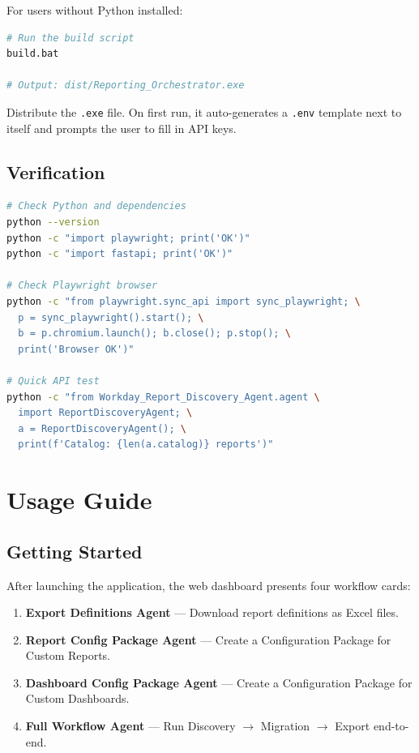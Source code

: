 \documentclass[12pt,a4paper]{article}
\begin{document}
For users without Python installed:

\begin{lstlisting}[language=bash, caption={Build Standalone .exe}, label={lst:build-exe}]
# Run the build script
build.bat

# Output: dist/Reporting_Orchestrator.exe
\end{lstlisting}

Distribute the \texttt{.exe} file. On first run, it auto-generates a \texttt{.env} template next to itself and prompts the user to fill in API keys.

\subsection{Verification}
\label{subsec:verification}

\begin{lstlisting}[language=bash, caption={Verify Installation}, label={lst:verify}]
# Check Python and dependencies
python --version
python -c "import playwright; print('OK')"
python -c "import fastapi; print('OK')"

# Check Playwright browser
python -c "from playwright.sync_api import sync_playwright; \
  p = sync_playwright().start(); \
  b = p.chromium.launch(); b.close(); p.stop(); \
  print('Browser OK')"

# Quick API test
python -c "from Workday_Report_Discovery_Agent.agent \
  import ReportDiscoveryAgent; \
  a = ReportDiscoveryAgent(); \
  print(f'Catalog: {len(a.catalog)} reports')"
\end{lstlisting}

\section{Usage Guide}
\label{sec:usage}

\subsection{Getting Started}
\label{subsec:getting-started}

After launching the application, the web dashboard presents four workflow cards:

\begin{enumerate}[leftmargin=2em]
  \item \textbf{Export Definitions Agent} --- Download report definitions as Excel files.
  \item \textbf{Report Config Package Agent} --- Create a Configuration Package for Custom Reports.
  \item \textbf{Dashboard Config Package Agent} --- Create a Configuration Package for Custom Dashboards.
  \item \textbf{Full Workflow Agent} --- Run Discovery $\rightarrow$ Migration $\rightarrow$ Export end-to-end.
\end{enumerate}
\end{document}
